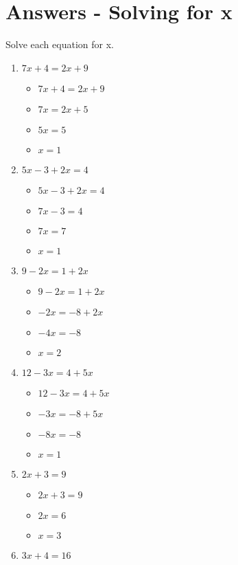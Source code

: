 \section{Answers - Solving for x}
Solve each equation for x.
\begin{enumerate}
\item $7x+4=2x+9$
  \begin{itemize}
  \item $7x+4=2x+9$
  \item $7x=2x+5$
  \item $5x=5$
  \item $x=1$
  \end{itemize}
\item $5x-3+2x=4$
  \begin{itemize}
  \item $5x-3+2x=4$
  \item $7x-3=4$
  \item $7x=7$
  \item $x=1$
  \end{itemize}
\item $9-2x=1+2x$
  \begin{itemize}
  \item $9-2x=1+2x$
  \item $-2x=-8+2x$
  \item $-4x=-8$
  \item $x=2$
  \end{itemize}
\item $12-3x=4+5x$
  \begin{itemize}
  \item $12-3x=4+5x$
  \item $-3x=-8+5x$
  \item $-8x=-8$
  \item $x=1$
  \end{itemize}
\item $2x+3=9$
  \begin{itemize}
  \item $2x+3=9$
  \item $2x=6$
  \item $x=3$
  \end{itemize}
\item $3x+4=16$

\end{enumerate}
